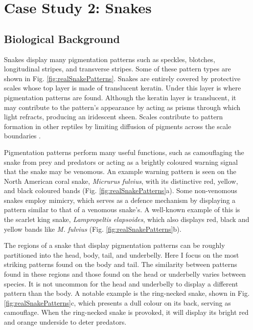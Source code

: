 \chapter{Case Study 2: Snakes}
\section{Biological Background}
Snakes display many pigmentation patterns such as speckles, blotches, longitudinal stripes, and transverse stripes. Some of these pattern types are shown in Fig. \ref{fig:realSnakePatterns}. Snakes are entirely covered by protective scales whose top layer is made of translucent keratin. Under this layer is where pigmentation patterns are found. Although the keratin layer is translucent, it may contribute to the pattern's appearance by acting as prisms through which light refracts, producing an iridescent sheen. Scales contribute to pattern formation in other reptiles by limiting diffusion of pigments across the scale boundaries \citep{manukyan2017}.

Pigmentation patterns perform many useful functions, such as camouflaging the snake from prey and predators or acting as a brightly coloured warning signal that the snake may be venomous. An example warning pattern is seen on the North American coral snake, \textit{Micrurus fulvius}, with its distinctive red, yellow, and black coloured bands (Fig. \ref{fig:realSnakePatterns}a). Some non-venomous snakes employ mimicry, which serves as a defence mechanism by displaying a pattern similar to that of a venomous snake's. A well-known example of this is the scarlet king snake, \textit{Lampropeltis elapsoides}, which also displays red, black and yellow bands like \textit{M. fulvius} (Fig. \ref{fig:realSnakePatterns}b).

The regions of a snake that display pigmentation patterns can be roughly partitioned into the head, body, tail, and underbelly. Here I focus on the most striking patterns found on the body and tail. The similarity between patterns found in these regions and those found on the head or underbelly varies between species. It is not uncommon for the head and underbelly to display a different pattern than the body. A notable example is the ring-necked snake, shown in Fig. \ref{fig:realSnakePatterns}c, which presents a dull colour on its back, serving as camouflage. When the ring-necked snake is provoked, it will display its bright red and orange underside to deter predators.

